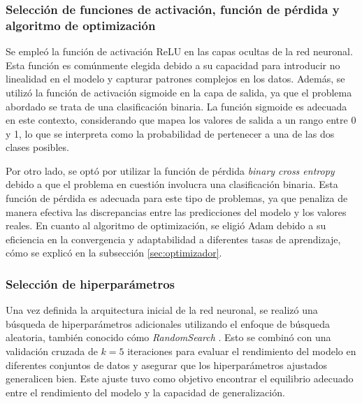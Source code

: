\subsubsection{Selección de funciones de activación, función de pérdida y algoritmo de optimización}
Se empleó la función de activación ReLU en las capas ocultas de la red neuronal. Esta función es 
comúnmente elegida debido a su capacidad para introducir no linealidad en el modelo y capturar 
patrones complejos en los datos. Además, se utilizó la función de activación sigmoide en la capa 
de salida, ya que el problema abordado se trata de una clasificación binaria. La función sigmoide
 es adecuada en este contexto, considerando que mapea los valores de salida a un rango entre 0 y 1, 
 lo que se interpreta como la probabilidad de pertenecer a una de las dos clases posibles.

 Por otro lado, se optó por utilizar la función de pérdida \emph{binary cross entropy} debido a 
 que el problema en cuestión involucra una clasificación binaria. Esta función de pérdida es 
 adecuada para este tipo de problemas, ya que penaliza de manera efectiva las discrepancias 
 entre las predicciones del modelo y los valores reales. En cuanto al algoritmo de optimización, 
 se eligió Adam debido a su eficiencia en la convergencia y adaptabilidad a diferentes tasas de 
 aprendizaje, cómo se explicó en la subsección \ref{sec:optimizador}.




\subsubsection{Selección de hiperparámetros}

Una vez definida la arquitectura inicial de la red neuronal, se realizó una búsqueda de hiperparámetros 
adicionales utilizando el enfoque de búsqueda aleatoria, también conocido cómo \emph{RandomSearch} \citep{CITE:50}. 
Esto se combinó con una validación cruzada de $k=5$ iteraciones para evaluar el rendimiento del modelo en diferentes 
conjuntos de datos y asegurar que los hiperparámetros ajustados generalicen bien. Este ajuste tuvo como objetivo 
encontrar el equilibrio adecuado entre el rendimiento del modelo y la capacidad de generalización. 

